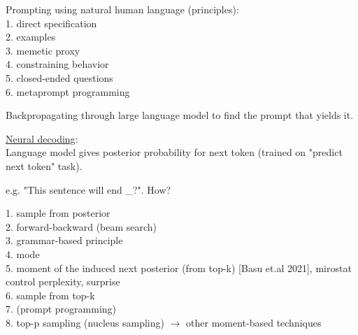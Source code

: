 \documentclass[12pt,a4paper]{article}
\begin{document}
Prompting using natural human language (principles):\\
1. direct specification \\
2. examples \\
3. memetic proxy \\
4. constraining behavior \\
5. closed-ended questions \\
6. metaprompt programming 

Backpropagating through large language model to find the prompt that yields it. 

\vspace{0.5cm}
\underline{Neural decoding}:\\
Language model gives posterior probability for next token (trained on "predict next token" task). 

e.g. "This sentence will end \_?". How?

1. sample from posterior\\
2. forward-backward (beam search)\\
3. grammar-based principle\\
4. mode \\
5. moment of the induced next posterior (from top-k) [Basu et.al 2021], mirostat control perplexity, surprise\\
6. sample from top-k\\
7. (prompt programming)\\
8. top-p sampling (nucleus sampling) $\rightarrow$ other moment-based techniques
\end{document}
